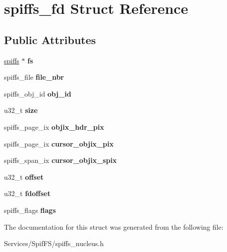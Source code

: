 \hypertarget{structspiffs__fd}{}\section{spiffs\+\_\+fd Struct Reference}
\label{structspiffs__fd}
\subsection*{Public Attributes}
\begin{DoxyCompactItemize}
\item 
\hypertarget{structspiffs__fd_aa21f646ac1a63815a78570700fdb8e91}{}\hyperlink{structspiffs}{spiffs} $\ast$ {\bfseries fs}\label{structspiffs__fd_aa21f646ac1a63815a78570700fdb8e91}

\item 
\hypertarget{structspiffs__fd_a5e8476292713fa8e1519e71b032ada35}{}spiffs\+\_\+file {\bfseries file\+\_\+nbr}\label{structspiffs__fd_a5e8476292713fa8e1519e71b032ada35}

\item 
\hypertarget{structspiffs__fd_a056d0dbea7a38ddda491430b83cca4c6}{}spiffs\+\_\+obj\+\_\+id {\bfseries obj\+\_\+id}\label{structspiffs__fd_a056d0dbea7a38ddda491430b83cca4c6}

\item 
\hypertarget{structspiffs__fd_afd4f6ecba84676728fc89441de8acec0}{}u32\+\_\+t {\bfseries size}\label{structspiffs__fd_afd4f6ecba84676728fc89441de8acec0}

\item 
\hypertarget{structspiffs__fd_aff20783acee2a6194396450cd09bf1be}{}spiffs\+\_\+page\+\_\+ix {\bfseries objix\+\_\+hdr\+\_\+pix}\label{structspiffs__fd_aff20783acee2a6194396450cd09bf1be}

\item 
\hypertarget{structspiffs__fd_a1c6bc0352d42c68802a7f8163ab90ca7}{}spiffs\+\_\+page\+\_\+ix {\bfseries cursor\+\_\+objix\+\_\+pix}\label{structspiffs__fd_a1c6bc0352d42c68802a7f8163ab90ca7}

\item 
\hypertarget{structspiffs__fd_ac34aa5584f1f378bb63eaf568c1a6b6e}{}spiffs\+\_\+span\+\_\+ix {\bfseries cursor\+\_\+objix\+\_\+spix}\label{structspiffs__fd_ac34aa5584f1f378bb63eaf568c1a6b6e}

\item 
\hypertarget{structspiffs__fd_a9f017848bfacc49db05c3276e108e3e8}{}u32\+\_\+t {\bfseries offset}\label{structspiffs__fd_a9f017848bfacc49db05c3276e108e3e8}

\item 
\hypertarget{structspiffs__fd_a761894a2f436b904a8b434f82849ee14}{}u32\+\_\+t {\bfseries fdoffset}\label{structspiffs__fd_a761894a2f436b904a8b434f82849ee14}

\item 
\hypertarget{structspiffs__fd_a20874e5b8a1ca24d4954400e538d0190}{}spiffs\+\_\+flags {\bfseries flags}\label{structspiffs__fd_a20874e5b8a1ca24d4954400e538d0190}

\end{DoxyCompactItemize}


The documentation for this struct was generated from the following file\+:\begin{DoxyCompactItemize}
\item 
Services/\+Spif\+F\+S/spiffs\+\_\+nucleus.\+h\end{DoxyCompactItemize}
